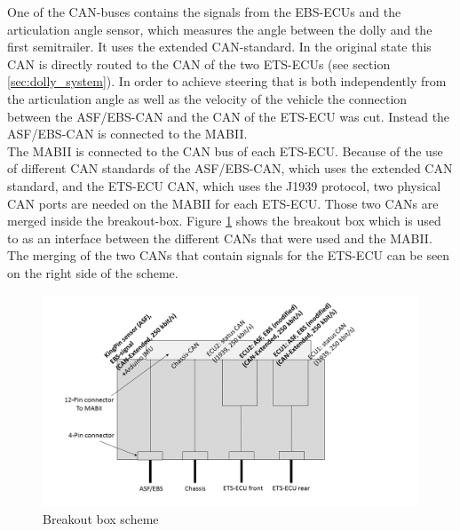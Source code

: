 \documentclass[ExampleMasters.tex]{subfiles}
\begin{document}
One of the CAN-buses contains the signals from the EBS-ECUs and the articulation angle sensor, which measures the angle between the dolly and the first semitrailer. It uses the extended CAN-standard. In the original state this CAN is directly routed to the CAN of the two ETS-ECUs (see section \ref{sec:dolly_system}). In order to achieve steering that is both independently from the articulation angle as well as the velocity of the vehicle the connection between the ASF/EBS-CAN and the CAN of the ETS-ECU was cut. Instead the ASF/EBS-CAN is connected to the MABII. \\
The MABII is connected to the CAN bus of each ETS-ECU. Because of the use of different CAN standards of the ASF/EBS-CAN, which uses the extended CAN standard, and the ETS-ECU CAN, which uses the J1939 protocol, two physical CAN ports are needed on the MABII for each ETS-ECU. Those two CANs are merged inside the breakout-box. Figure \ref{fig:BOB} shows the breakout box which is used to as an interface between the different CANs that were used and the MABII. The merging of the two CANs that contain signals for the ETS-ECU can be seen on the right side of the scheme.
\begin{figure}[h]
	\centering
	\includegraphics[width=1\linewidth]{figures/BOB_schema}
	\caption{Breakout box scheme}
	\label{fig:BOB}
\end{figure}
\end{document}
